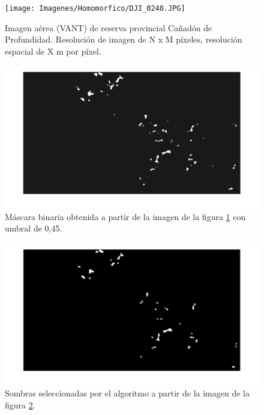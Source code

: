 \begin{figure}[h!]
    \texttt{[image: Imagenes/Homomorfico/DJI\_0240.JPG]}
     \hfill
     \caption{Imagen aérea (VANT) de reserva provincial Cañadón de Profundidad. Resolución de imagen de N x M píxeles, resolución espacial de X m por píxel.}
    \label{Cañadon_homo}
\end{figure}

\begin{figure}[h!]
    \includegraphics[width=\textwidth]{Imagenes/Homomorfico/DJI_240_bin.png}
     \hfill
     \caption{Máscara binaria obtenida a partir de la imagen de la figura \ref{Cañadon_homo} con umbral de 0,45.}
    \label{mascaraCañadon}
\end{figure}

\begin{figure}[h!]
    \includegraphics[width=\textwidth]{Imagenes/Homomorfico/DJI_240_sel.png}
     \hfill
     \caption{Sombras seleccionadas por el algoritmo a partir de la imagen de la figura \ref{mascaraCañadon}.}
    \label{seleccionadaST}
\end{figure}